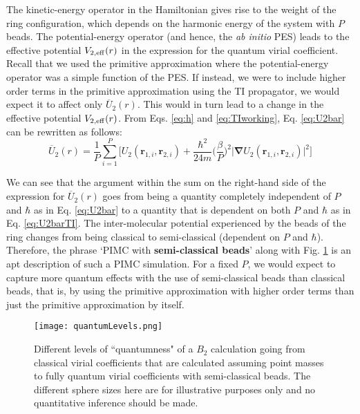             The kinetic-energy operator in the Hamiltonian gives rise to the weight of the ring configuration, which depends on the harmonic energy of the system with $P$ beads. The potential-energy operator (and hence, the \emph{ab initio} PES) leads to the effective potential $V_{2,\rm{eff}} (r)$ in the expression for the quantum virial coefficient. Recall that we used the primitive approximation where the potential-energy operator was a simple function of the PES. If instead, we were to include higher order terms in the primitive approximation using the TI propagator, we would expect it to affect only $\overline{U}_2 (r)$. This would in turn lead to a change in the effective potential $V_{2,\rm{eff}} (r)$. From Eqs. \eqref{eq:h} and \eqref{eq:TIworking}, Eq. \eqref{eq:U2bar} can be rewritten as follows:
            \begin{equation}\label{eq:U2barTI}
                \overline{U}_2 (r) = \displaystyle\frac{1}{P} \sum\limits_{i=1}^P \Bigg[ U_2 (\bm{r}_{1,i}, \bm{r}_{2,i}) + \frac{\hbar^2}{24m} \bigg(\displaystyle\frac{\beta}{P} \bigg)^2 \big| \pmb{\nabla} U_2 (\bm{r}_{1,i}, \bm{r}_{2,i}) \big|^2 \Bigg]
            \end{equation}

            We can see that the argument within the sum on the right-hand side of the expression for $\overline{U}_2 (r)$ goes from being a quantity completely independent of $P$ and $\hbar$ as in Eq. \eqref{eq:U2bar} to a quantity that is dependent on both $P$ and $\hbar$ as in Eq. \eqref{eq:U2barTI}. The inter-molecular potential experienced by the beads of the ring changes from being classical to semi-classical (dependent on $P$ and $\hbar$). Therefore, the phrase `PIMC with \textbf{semi-classical beads}' along with Fig. \ref{quantumness} is an apt description of such a PIMC simulation. For a fixed $P$, we would expect to capture more quantum effects with the use of semi-classical beads than classical beads, that is, by using the primitive approximation with higher order terms than just the primitive approximation by itself.

            \begin{figure}
                \centering
                \texttt{[image: quantumLevels.png]}
                \caption{Different levels of ``quantumness" of a $B_2$ calculation going from classical virial coefficients that are calculated assuming point masses to fully quantum virial coefficients with semi-classical beads. The different sphere sizes here are for illustrative purposes only and no quantitative inference should be made.} \label{quantumness}
            \end{figure}
